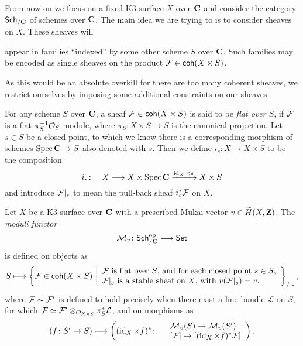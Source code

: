 From now on we focus on a fixed K3 surface $X$ over $\mathbf C$ and consider the category $\mathsf{Sch}_{/\mathbf C}$ of schemes over $\mathbf C$. The main idea we are trying to is to consider sheaves on $X$. These sheaves will

appear in families ``indexed'' by some other scheme $S$ over $\mathbf C$. Such families may be encoded as single sheaves on the product $\mathcal F \in \mathsf{coh}(X \times S)$. 


As this would be an absolute overkill for there are too many coherent sheaves, we restrict ourselves by imposing some additional constraints on our sheaves.

For any scheme $S$ over $\mathbf C$, a sheaf $\mathcal F \in \mathsf{coh}(X \times S)$ is said to be \emph{flat over $S$}, if $\mathcal F$ is a flat $\pi_S^{-1} \mathcal{O}_{S}$-module, where $\pi_S \colon X \times S \to S$ is the canonical projection. Let $s \in S$ be a closed point, to which we know there is a corresponding morphism of schemes $\operatorname{Spec}\mathbf C \to S$ also denoted with $s$. Then we define $i_s \colon X \to X \times S$ to be the composition
\[
    i_s \colon \quad X \longrightarrow X \times \operatorname{Spec}\mathbf C \xrightarrow{\operatorname{id}_{X} \times s} X \times S
\]
and introduce $\mathcal F|_s$ to mean the pull-back sheaf $i_s^*\mathcal F$ on $X$.


 

\begin{definition}
    \label{Definition of moduli functor}
    Let $X$ be a K3 surface over $\mathbf C$ with a prescribed Mukai vector $v \in \widetilde{H}(X, \mathbf Z)$. The \emph{moduli functor}
    \[
        \mathcal M_v \colon \mathsf{Sch}_{/\mathbf C}^{\text{op}} \longrightarrow \mathsf{Set}
    \]
    is defined on objects as 
    \[
        S \longmapsto \left\{\mathcal F \in \mathsf{coh}(X \times S) \ \middle| 
        \begin{array}{l}
            \text{$\mathcal F$ is flat over $S$, and for each closed point $s \in S$,} \\
            \text{$\mathcal F|_s$ is a stable sheaf on $X$, with $v(\mathcal F|_s) = v$.}
        \end{array}
        \right\}_{/\sim},
    \]
    where $\mathcal F \sim \mathcal F'$ is defined to hold precisely when there exist a line bundle $\mathcal L$ on $S$, for which $\mathcal F \simeq \mathcal F' \otimes_{\mathcal{O}_{X \times S}} \pi_S^*\mathcal L$, and on morphisms as
    \[
        (f\colon S' \to S) \longmapsto \left( (\operatorname{id}_{X} \times f)^* \colon
            \begin{array}{r l}
                & \mathcal M_v(S) \to \mathcal M_v(S') \\
                & [\mathcal F] \mapsto [(\operatorname{id}_{X} \times f)^*\mathcal F]
            \end{array}
            \right).
    \]
\end{definition}

